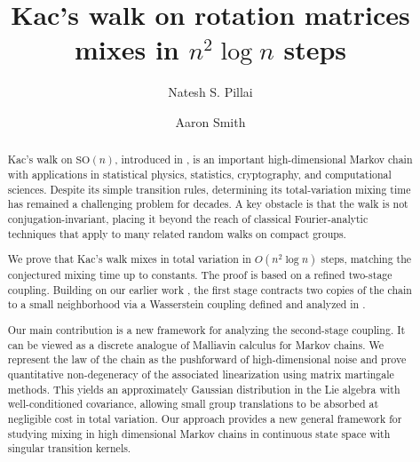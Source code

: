 \documentclass[11pt, reqno]{amsart}
\numberwithin{equation}{section}
\theoremstyle{remark}
\newcommand{\1}{\mathbf{1}}
\newcommand{\SO}{\mathrm{SO}}
\begin{document}
\title[Kac's walk on rotation matrices mixes in $n^2 \log n$ steps]{Kac's walk on rotation matrices mixes in $n^2 \log n$ steps}
\author{Natesh S. Pillai}

\address{Department of Statistics, Harvard University}

\author{Aaron Smith}
\address{Department of Mathematics and Statistics, University of Ottawa}



\begin{abstract}
Kac’s walk on $\SO(n)$, introduced in \cite{hastings70}, is an important high-dimensional Markov chain with applications in statistical physics, statistics, cryptography, and computational sciences. Despite its simple transition rules, determining its total-variation mixing time has remained a  challenging problem for decades. A key obstacle is that the walk is not conjugation-invariant, placing it beyond the reach of classical Fourier-analytic techniques that apply to many related random walks on compact groups.

We prove that Kac’s walk mixes in total variation in $O(n^2 \log n)$ steps, matching the conjectured mixing time up to constants. The proof is based on a refined two-stage coupling. Building on our earlier work \cite{PillaiSmith}, the first stage contracts two copies of the chain to a small neighborhood via a Wasserstein coupling defined and analyzed in \cite{Oliveira}. 

Our main contribution is a new framework for analyzing the second-stage coupling. It can be viewed as a discrete analogue of Malliavin calculus for Markov chains. We represent the law of the chain as the pushforward of high-dimensional noise and prove quantitative non-degeneracy of the associated linearization using matrix martingale methods. This yields an approximately Gaussian distribution in the Lie algebra with well-conditioned covariance, allowing small group translations to be absorbed at negligible cost in total variation. Our approach provides a new general framework for studying mixing in high dimensional Markov chains in continuous state space with singular transition kernels.

\end{abstract}
\maketitle
\end{document}
